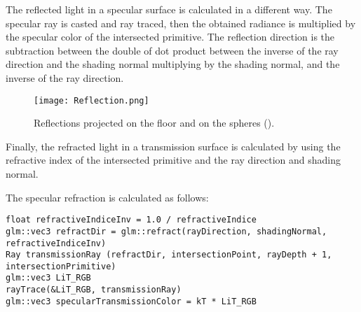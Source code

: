 \par
The reflected light in a specular surface is calculated in a different way.
The specular ray is casted and ray traced, then the obtained radiance is multiplied by the specular color of the intersected primitive.
The reflection direction is the subtraction between the double of dot product between the inverse of the ray direction and the shading normal multiplying by the shading normal, and the inverse of the ray direction.

\begin{figure}[H]
	\centering
	\caption{Reflections projected on the floor and on the spheres (\cite{RTReflections}).}
	\label{Reflection.}
	\texttt{[image: Reflection.png]}
\end{figure}

\par
Finally, the refracted light in a transmission surface is calculated by using the refractive index of the intersected primitive and the ray direction and shading normal.

The specular refraction is calculated as follows:

\begin{lstlisting}[caption={Algorithm of Specular Transmission}, captionpos=b, label=Transmission]
float refractiveIndiceInv = 1.0 / refractiveIndice
glm::vec3 refractDir = glm::refract(rayDirection, shadingNormal, refractiveIndiceInv)
Ray transmissionRay (refractDir, intersectionPoint, rayDepth + 1, intersectionPrimitive)
glm::vec3 LiT_RGB
rayTrace(&LiT_RGB, transmissionRay)
glm::vec3 specularTransmissionColor = kT * LiT_RGB
\end{lstlisting}

\iffalse
First, the shading normal is inverted if the origin of the ray was inside a primitive, like a sphere, and if it was not then the refractive index is inverted.
Then, it is calculated two auxiliary scalar projections:
$cosTheta1$
and
$cosTheta2$
.
$cosTheta1$
is the dot product of the inverse of the shading normal and the ray direction, and
$cosTheta2$
is the difference of one and refractive index squared multiplied by one minus
$cosTheta1$
squared.
Then, if
$cosTheta2$
is greater than zero, then the direction of the transmission ray is ray direction multiplied with refractive index plus shading normal multiplied by refractive index multiplied $cosTheta1$
minus square root of 
$cosTheta2$
.
Else, the direction of the transmission ray is just ray direction plus shading normal multiplied by the double of
$cosTheta1$
.
\fi

